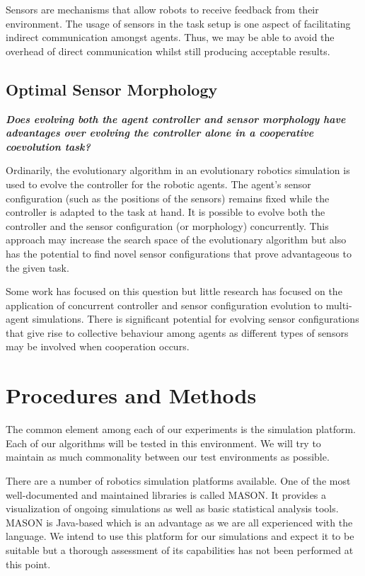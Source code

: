 \documentclass[a4paper,12pt]{article}
\begin{document}
Sensors are mechanisms that allow robots to receive feedback from their environment. The usage of sensors in the task setup is one aspect of facilitating indirect communication amongst agents. Thus, we may be able to avoid the overhead of direct communication whilst still producing acceptable results.


\subsection{Optimal Sensor Morphology}

\textbf{ \textit{Does evolving both the agent controller and sensor morphology have advantages over evolving the controller alone in a cooperative coevolution task?}}

Ordinarily, the evolutionary algorithm in an evolutionary robotics simulation is used to evolve the controller for the robotic agents. The agent’s sensor configuration (such as the positions of the sensors) remains fixed while the controller is adapted to the task at hand. It is possible to evolve both the controller and the sensor configuration (or morphology) concurrently. This approach may increase the search space of the evolutionary algorithm but also has the potential to find novel sensor configurations that prove advantageous to the given task.

Some work has focused on this question but little research has focused on the application of concurrent controller and sensor configuration evolution to multi-agent simulations. There is significant potential for evolving sensor configurations that give rise to collective behaviour among agents as different types of sensors may be involved when cooperation occurs.


\section{Procedures and Methods}
The common element among each of our experiments is the simulation platform. Each of our algorithms will be tested in this environment. We will try to maintain as much commonality between our test environments as possible.

There are a number of robotics simulation platforms available. One of the most well-documented and maintained libraries is called MASON. It provides a visualization of ongoing simulations as well as basic statistical analysis tools. MASON is Java-based which is an advantage as we are all experienced with the language. We intend to use this platform for our simulations and expect it to be suitable but a thorough assessment of its capabilities has not been performed at this point.
\end{document}
